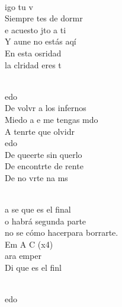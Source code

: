 \documentclass[12pt]{article}
\begin{document}
\begin{multicols*}{2}
\begin{cancion}[Miedo][M Clan]
                \jump\\
                igo tu v\\
                Siempre tes de dormr\\
                e acuesto jto a ti\\
                Y aune no estás aqí\\
                En esta osridad \\
                la clridad eres t         \\\jump\\
                \begin{chorus}%
                edo\\
                De volvr a los infernos\\
                Miedo a e me tengas mdo\\
                A tenrte que olvidr      \\
                edo\\
                De queerte sin querlo\\
                De encontrte de rente\\
                De no vrte na ms\\
                \end{chorus}%
                \jump\\
                a se que es el final\\
                o habrá segunda parte\\
                 no se cómo hacerpara borrarte.\\
        Em  A  C (x4)\\
        \jump
                ara emper\\
                Di que es el finl \\\jump\\
                \begin{chorus}%
                edo\\

\end{chorus}
\end{cancion}
\end{multicols*}
\end{document}
